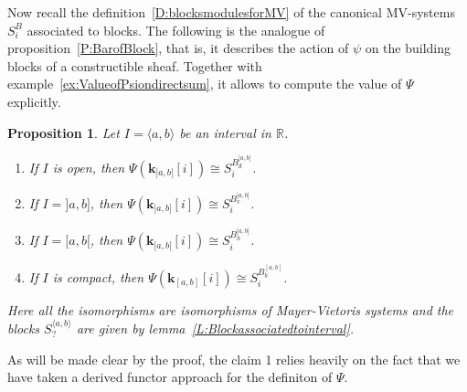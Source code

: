 \documentclass[a4paper, english, 11pt]{article}
\newcommand{\kk}[0]{\textbf{k}}
\newcommand{\0}{\vec{0}}
\newcommand{\R}[0]{\mathbb{R}}
\newtheorem{prop}{Proposition}[section]
\newtheorem{remark}[prop]{Remark}
\begin{document}
Now recall the definition~\ref{D:blocksmodulesforMV} of the canonical MV-systems $S_i^B$ associated to blocks. The following is the analogue of proposition~\ref{P:BarofBlock}, that is, it describes the action of $\psi$ on the building blocks of a constructible sheaf. Together with example~\ref{ex:ValueofPsiondirectsum}, it allows to compute the value of $\Psi$ explicitly. 
\begin{prop}\label{P:PsionIntervals}  Let $I=\langle a, b\rangle$ be an interval in $\R$. 
\begin{enumerate}
    \item If $I$ is open, then  $\Psi ({\kk_{] a, b[}}[i]) \cong 
S_i^{B_{d}^{] a, b [}}$.
    \item If $I=]a,b]$, then  $\Psi ({ \kk_{] a, b]}}[i]) \cong 
S_i^{B_{v}^{] a, b]}}$.
    \item If $I=[a, b[$, then  $\Psi ({ \kk_{[ a, b[}}[i]) \cong 
S_i^{B_{h}^{[a, b[}}$. 
    \item If $I$ is compact, then  $\Psi ({ \kk_{[ a, b]}}[i]) \cong 
S_i^{B_{b}^{[a, b]}}$. 
\end{enumerate}
Here all the isomorphisms are isomorphisms of Mayer-Vietoris systems and the blocks $S_{?}^{\langle a, b\rangle}$ are given by lemma~\ref{L:Blockassociatedtointerval}.
\end{prop}
As will be made clear by the proof, the claim 1  relies heavily on the fact that we have taken a derived functor approach for the definiton of $\Psi$. 
\end{document}
